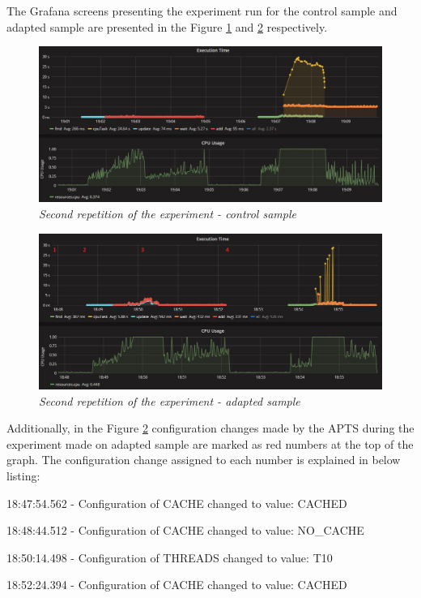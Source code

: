 \documentclass[12pt,a4paper]{article}
\let\tmpone\enumerate
\let\tmptwo\endenumerate
\renewenvironment{enumerate}{\tmpone\addtolength{\itemsep}{-0.4\baselineskip}}{\tmptwo}
\begin{document}
The Grafana screens presenting the experiment run for the control sample and adapted sample are presented in the Figure \ref{figure:random:screen:control:2} and \ref{figure:random:screen:adapted:2} respectively. 


\begin{figure}[!htb]
\centering
\includegraphics[width=1\textwidth]{2-ctrl}
\caption{\textit{Second repetition of the experiment - control sample}} \label{figure:random:screen:control:2}
\end{figure}

\begin{figure}[!htb]
\centering
\includegraphics[width=1\textwidth]{2-adap}
\caption{\textit{Second repetition of the experiment - adapted sample}} \label{figure:random:screen:adapted:2}
\end{figure}

Additionally, in the Figure \ref{figure:random:screen:adapted:2} configuration changes made by the APTS during the experiment made on adapted sample are marked as red numbers at the top of the graph. The configuration change assigned to each number is explained in below listing: 

\begin{enumerate}
\item 18:47:54.562 - Configuration of CACHE changed to value: CACHED
\item 18:48:44.512 - Configuration of CACHE changed to value: NO\_CACHE
\item 18:50:14.498 - Configuration of THREADS changed to value: T10
\item 18:52:24.394 - Configuration of CACHE changed to value: CACHED
\end{enumerate}
\end{document}
